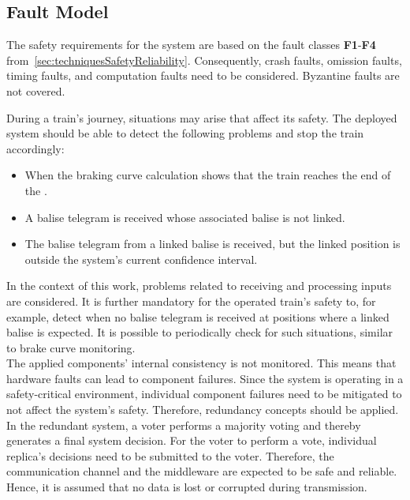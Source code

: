 \subsection{Fault Model}
\label{subsec:faultModel}
The safety requirements for the system are based on the fault classes \textbf{F1}-\textbf{F4} from~\autoref{sec:techniquesSafetyReliability}\cite{CristianFaultModel}.
Consequently, crash faults, omission faults, timing faults, and computation faults need to be considered.
Byzantine faults are not covered.

During a train's journey, situations may arise that affect its safety.
The deployed system should be able to detect the following problems and stop the train accordingly:

\begin{itemize}
\item When the braking curve calculation shows that the train reaches the end of the .
\item A balise telegram is received whose associated balise is not linked.
\item The balise telegram from a linked balise is received, but the linked position is outside the system's current confidence interval.
\end{itemize}

In the context of this work, problems related to receiving and processing inputs are considered.
It is further mandatory for the operated train's safety to, for example, detect when no balise telegram is received at positions where a linked balise is expected.
It is possible to periodically check for such situations, similar to brake curve monitoring.
\\

The applied components' internal consistency is not monitored.
This means that hardware faults can lead to component failures.
Since the system is operating in a safety-critical environment, individual component failures need to be mitigated to not affect the system's safety.
Therefore, redundancy concepts should be applied.
\\

In the redundant system, a voter performs a majority voting and thereby generates a final system decision.
For the voter to perform a vote, individual replica's decisions need to be submitted to the voter.
Therefore, the communication channel and the  middleware are expected to be safe and reliable.
Hence, it is assumed that no data is lost or corrupted during transmission.
\\


